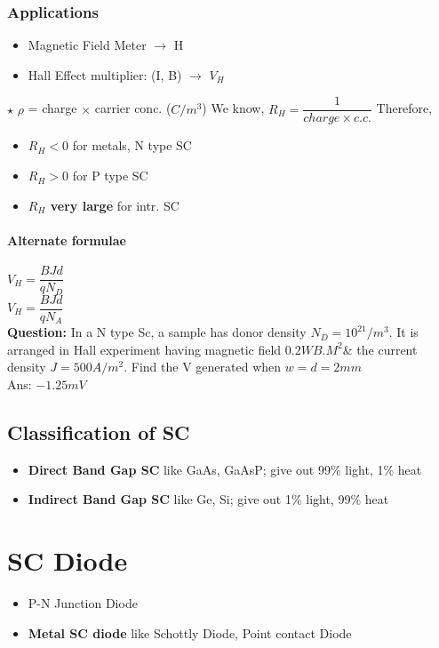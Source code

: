 \documentclass[10pt, a4paper]{report}
\begin{document}
	\subsection{Applications}
	\begin{itemize}
		\item Magnetic Field Meter $\rightarrow$ H
		\item Hall Effect multiplier: (I, B) $\rightarrow$ $ V_H $
	\end{itemize}
	$\star$ $ \rho $ = charge $\times$ carrier conc. ($ C/m^3 $)
	We know, $ R_H = \dfrac{1}{charge \times c.c.} $
	Therefore,
	\begin{itemize}
		\item \textbf{$ R_H < 0 $} for metals, N type SC
		\item \textbf{$ R_H > 0 $} for P type SC
		\item \textbf{$ R_H $ very large} for intr. SC
	\end{itemize}
	\subsubsection{Alternate formulae}
	$ V_H = \dfrac{BJd}{qN_D} $\\
	$ V_H = \dfrac{BJd}{qN_A} $\\
	\textbf{Question:} In a N type Sc, a sample has donor density $ N_D = 10^{21}/m^3 $. It is arranged in Hall experiment having magnetic field $ 0.2 WB.M^2 $\& the current density $ J =  500A/m^2$. Find the V generated when $ w=d=2mm $\\
	Ans: $ -1.25mV $
	
	\section{Classification of SC}
	\begin{itemize}
		\item \textbf{Direct Band Gap SC} like GaAs, GaAsP; give out 99\% light, 1\% heat
		\item \textbf{Indirect Band Gap SC} like Ge, Si; give out 1\% light, 99\% heat
	\end{itemize}

	\chapter{SC Diode}
	\begin{itemize}
		\item P-N Junction Diode
		\item \textbf{Metal SC diode} like Schottly Diode, Point contact Diode
	\end{itemize}
\end{document}
